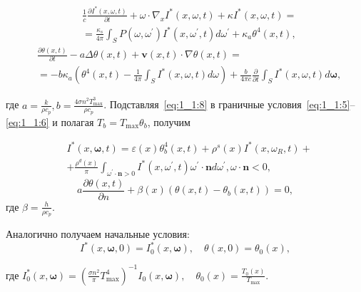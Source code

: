 \begin{equation}
    \label{eq:1_1:9}
    \begin{aligned}
        &\frac{1}{c} \frac{\partial I^{*}(x, \omega, t)}{\partial t}
        +\omega \cdot \nabla_{x} I^{*}(x, \omega, t) +\kappa I^{*}(x, \omega, t)=\\
        &= \frac{\kappa_{s}}{4 \pi} \int_{S} P\left(\omega, \omega^{\prime}\right) I^{*}
        \left(x, \omega^{\prime}, t\right) d \omega^{\prime}+\kappa_{a} \theta^{4}(x, t),
    \end{aligned}
\end{equation}
\begin{equation}
    \label{eq:1_1:10}
    \begin{aligned}
        &\frac{\partial \theta(x, t)}{\partial t}
        -a \Delta \theta(x, t)+\mathbf{v}(x, t) \cdot \nabla \theta(x, t)=\\
        &=-b \kappa_{a}\left(\theta^{4}(x, t)-\frac{1}{4 \pi}
        \int_{S} I^{*}(x, \omega, t) d \omega\right)
        +\frac{b}{4 \pi c} \frac{\partial}{\partial t}
        \int_{S} I^{*}(x, \omega, t) d \boldsymbol{\omega},
    \end{aligned}
\end{equation}

где $a=\frac{k}{\rho c_{p}}, b=\frac{4 \sigma n^{2} T_{\max }^{3}}{\rho c_{p}}$.
Подставляя~\eqref{eq:1_1:8} в граничные условия~\eqref{eq:1_1:5}--\eqref{eq:1_1:6}
и полагая $T_{b}=T_{\max } \theta_{b}$, получим

\begin{equation}
    \label{eq:1_1:11}
    \begin{aligned}
        & I^{*}(x, \boldsymbol{\omega}, t) =
        \varepsilon(x) \theta_{b}^{4}(x, t)
        +\rho^{s}(x) I^{*}\left(x, \omega_{R}, t\right)+ \\
        & +\frac{\rho^{d}(x)}{\pi} \int_{\omega^{\prime} \cdot \mathbf{n}>0} I^{*}
        \left(x, \omega^{\prime}, t\right) \omega^{\prime}
        \cdot \mathbf{n} d \omega^{\prime}, \omega \cdot \mathbf{n}<0,
    \end{aligned}
\end{equation}
\begin{equation}
    \label{eq:1_1:12}
    a \frac{\partial \theta(x, t)}{\partial n}+\beta(x)\left(\theta(x, t)
    -\theta_{b}(x, t)\right)=0,
\end{equation}
где $\beta=\frac{h}{\rho c_{p}}$.


Аналогично получаем начальные условия:
\begin{equation}
    \label{eq:1_1:13}
    I^{*}(x, \boldsymbol{\omega}, 0)=I_{0}^{*}(x, \boldsymbol{\omega}),
    \quad \theta(x, 0)=\theta_{0}(x),
\end{equation}

где $I_{0}^{*}(x, \boldsymbol{\omega})=\left(\frac{\sigma n^{2}}{\pi}
T_{\max }^{4}\right)^{-1} I_{0}(x, \boldsymbol{\omega}),
\quad \theta_{0}(x)=\frac{T_{0}(x)}{T_{\max }}$.
